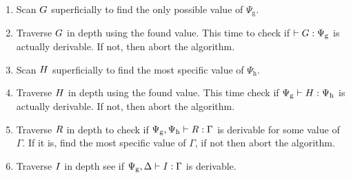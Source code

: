 \begin{enumerate}
\item Scan $G$ superficially to find the only possible value of
  $\Psi_{\mathrm{g}}$.
\item Traverse $G$ in depth using the found value. This time to check if
  $|- {G} : {\Psi_{\mathrm{g}}}$ is actually derivable. If not, then
  abort the algorithm.
\item Scan $H$ superficially to find the most specific value of
  $\Psi_{\mathrm{h}}$.
\item Traverse $H$ in depth using the found value. This time check if
  ${\Psi_{\mathrm{g}}} |- {H} : {\Psi_{\mathrm{h}}}$ is actually
  derivable. If not, then abort the algorithm.
\item Traverse $R$ in depth to check if
  ${\Psi_{\mathrm{g}},\Psi_{\mathrm{h}}} |- {R} : {\Gamma}$ is
  derivable for some value of $\Gamma$. If it is, find the most specific value
  of $\Gamma$, if not then abort the algorithm.
\item Traverse $I$ in depth see if
  ${\Psi_{\mathrm{g}}, \Delta} |- {I} : {\Gamma}$ is derivable.
\end{enumerate}
